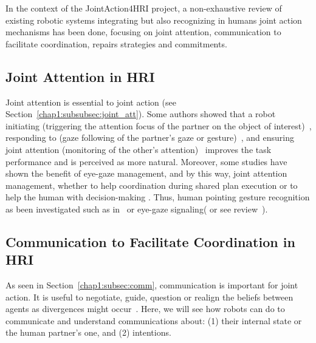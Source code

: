 \documentclass[a4paper,11pt,twoside]{StyleThese}
\begin{document}
In the context of the JointAction4HRI project, a non-exhaustive review of existing robotic systems integrating but also recognizing in humans joint action mechanisms has been done, focusing on joint attention, communication to facilitate coordination, repairs strategies and commitments.

\subsection{Joint Attention in HRI}
Joint attention is essential to joint action (see Section~\ref{chap1:subsubsec:joint_att}). Some authors showed that a robot initiating (\ie triggering the attention focus of the partner on the object of interest)~\cite{imai_2003_physical}, responding to (\ie gaze following of the partner's gaze or gesture)~\cite{yu_2010_investigating}, and ensuring joint attention (\ie monitoring of the other's attention)~\cite{huang_2010_joint} improves the task performance and is perceived as more natural. Moreover, some studies have shown the benefit of eye-gaze management, and by this way, joint attention management, whether to help coordination during shared plan execution \cite{lallee_2013_cooperative} or to help the human with decision-making \cite{boucher_2010_facilitation, boucher_2012_reach}. Thus, human pointing gesture recognition as been investigated such as in~\cite{nickel_2007_visual} or eye-gaze signaling(\eg \cite{staudte_2009_visual} or see review~\cite{admoni_2017_social}).

\subsection{Communication to Facilitate Coordination in HRI}

As seen in Section~\ref{chap1:subsec:comm}, communication is important for joint action. It is useful to negotiate, guide, question or realign the beliefs between agents as divergences might occur~\cite{cohen_1991_teamwork}. Here, we will see how robots can do to communicate and understand communications about: (1)  their internal state or the human partner's one, and (2) intentions.
\end{document}
